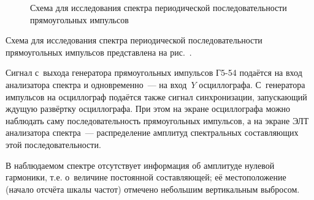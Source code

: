 
\experiment
\begin{figure}[h!]
\centering
{}
\caption{Схема для исследования спектра периодической последовательности
прямоугольных импульсов}
\end{figure}

Схема для исследования спектра периодической последовательности прямоугольных
импульсов представлена на рис.~.

Сигнал с~выхода генератора прямоугольных импульсов Г5-54 подаётся на вход
анализатора спектра и одновременно~--- на вход~$Y$ осциллографа. С~генератора
импульсов на осциллограф подаётся также сигнал синхронизации, запускающий ждущую
развёртку осциллографа. При этом на экране осциллографа можно наблюдать саму
последовательность прямоугольных импульсов, а на экране ЭЛТ анализатора
спектра~--- распределение амплитуд спектральных составляющих этой
последовательности.

В наблюдаемом спектре отсутствует информация об амплитуде нулевой гармоники,
т.е. о~величине постоянной составляющей; её местоположение (начало отсчёта шкалы
частот) отмечено небольшим вертикальным выбросом.

